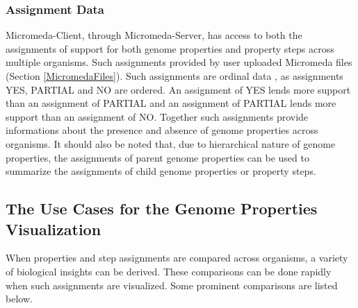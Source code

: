 \subsubsection{Assignment Data}

Micromeda-Client, through Micromeda-Server, has access to both the assignments of support for both genome properties and property steps across multiple organisms. Such assignments provided by user uploaded Micromeda files (Section \ref{MicromedaFiles}). Such assignments are ordinal data \cite{richardson2018genome,agresti2010analysis}, as assignments YES, PARTIAL and NO are ordered. An assignment of YES lends more support than an assignment of PARTIAL and an assignment of PARTIAL lends more support than an assignment of NO. Together such assignments provide informations about the presence and absence of genome properties across organisms. It should also be noted that, due to hierarchical nature of genome properties, the assignments of parent genome properties can be used to summarize the assignments of child genome properties or property steps.

\subsection{The Use Cases for the Genome Properties Visualization}

When properties and step assignments are compared across organisms, a variety of biological insights can be derived. These comparisons can be done rapidly when such assignments are visualized. Some prominent comparisons are listed below.

